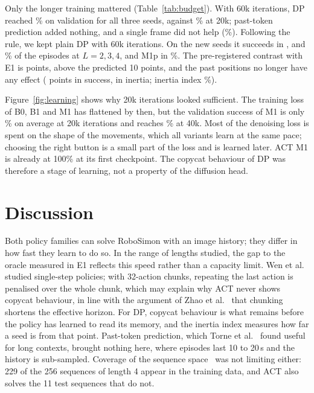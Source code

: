 \documentclass[10pt,a4paper]{article}
\begin{document}
Only the longer training mattered (Table~\ref{tab:budget}). With 60k iterations, DP reached \% on validation for all three seeds, against \% at 20k; past-token prediction added nothing, and a single frame did not help (\%). Following the rule, we kept plain DP with 60k iterations. On the new seeds it succeeds in ,  and \% of the episodes at $L=2,3,4$, and M1p in \%. The pre-registered contrast with E1 is  points, above the predicted 10 points, and the past positions no longer have any effect ( points in success,  in inertia; inertia index \%).

Figure~\ref{fig:learning} shows why 20k iterations looked sufficient. The training loss of B0, B1 and M1 has flattened by then, but the validation success of M1 is only \% on average at 20k iterations and reaches \% at 40k. Most of the denoising loss is spent on the shape of the movements, which all variants learn at the same pace; choosing the right button is a small part of the loss and is learned later. ACT M1 is already at 100\% at its first checkpoint. The copycat behaviour of DP was therefore a stage of learning, not a property of the diffusion head.

\section{Discussion}

Both policy families can solve RoboSimon with an image history; they differ in how fast they learn to do so. In the range of lengths studied, the gap to the oracle measured in E1 reflects this speed rather than a capacity limit. Wen et al.~\citep{wen2020copycat} studied single-step policies; with 32-action chunks, repeating the last action is penalised over the whole chunk, which may explain why ACT never shows copycat behaviour, in line with the argument of Zhao et al.~\citep{zhao2023act} that chunking shortens the effective horizon. For DP, copycat behaviour is what remains before the policy has learned to read its memory, and the inertia index measures how far a seed is from that point. Past-token prediction, which Torne et al.~\citep{torne2025ptp} found useful for long contexts, brought nothing here, where episodes last 10 to 20\,s and the history is sub-sampled. Coverage of the sequence space~\citep{sobolmark2026bpp} was not limiting either: 229 of the 256 sequences of length 4 appear in the training data, and ACT also solves the 11 test sequences that do not.
\end{document}
